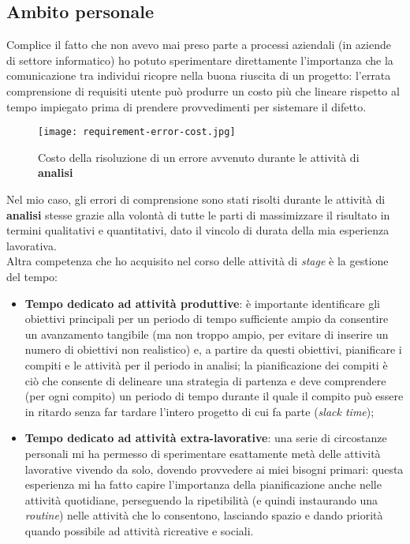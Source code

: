 \subsection*{Ambito personale}
Complice il fatto che non avevo mai preso parte a processi aziendali (in aziende di settore informatico) ho potuto sperimentare direttamente l'importanza che la comunicazione tra individui ricopre nella buona riuscita di un progetto: l'errata comprensione di requisiti utente può produrre 
un costo più che lineare rispetto al tempo impiegato prima di prendere provvedimenti per sistemare il difetto.

\begin{figure}[H]
    \centering
    \texttt{[image: requirement-error-cost.jpg]}
    \caption[Costo della risoluzione di un errore avvenuto durante le attività di \textbf{analisi}]{Costo della risoluzione di un errore avvenuto durante le attività di \textbf{analisi} \footnotemark}
    \label{fig:req}
  \end{figure}
  {}

Nel mio caso, gli errori di comprensione sono stati risolti durante le attività di \textbf{analisi} stesse grazie alla volontà di tutte le parti di massimizzare il risultato in termini qualitativi e quantitativi, dato il vincolo di durata della mia esperienza lavorativa. \\
Altra competenza che ho acquisito nel corso delle attività di \textit{stage} è la gestione del tempo:
\begin{itemize}
    \item \textbf{Tempo dedicato ad attività produttive}: è importante identificare gli obiettivi principali per un periodo di tempo sufficiente ampio da consentire un avanzamento tangibile (ma non troppo ampio, per evitare di inserire un numero di obiettivi non realistico) e, a partire da questi obiettivi, pianificare i compiti e le attività per il periodo in analisi;
            la pianificazione dei compiti è ciò che consente di delineare una strategia di partenza e deve comprendere (per ogni compito) un periodo di tempo durante il quale il compito può essere in ritardo senza far tardare l'intero progetto di cui fa parte (\textit{slack time});
    \item \textbf{Tempo dedicato ad attività extra-lavorative}: una serie di circostanze personali mi ha permesso di sperimentare esattamente metà delle attività lavorative vivendo da solo, dovendo provvedere ai miei bisogni primari: questa esperienza mi ha fatto capire l'importanza della pianificazione anche nelle attività quotidiane, perseguendo la ripetibilità (e quindi instaurando una \textit{routine}) nelle attività che lo consentono,
            lasciando spazio e dando priorità quando possibile ad attività ricreative e sociali.
\end{itemize}

